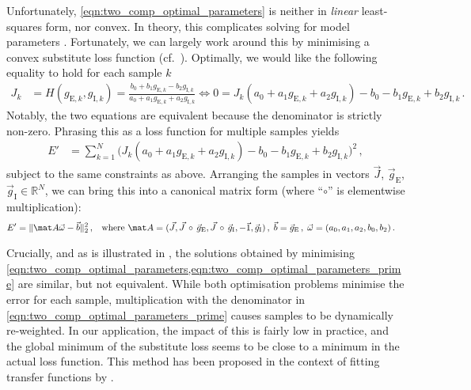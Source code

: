 Unfortunately, \cref{eqn:two_comp_optimal_parameters} is neither in \emph{linear} least-squares form, nor convex.
In theory, this complicates solving for model parameters \citep{rockafellar1993lagrange}.
Fortunately, we can largely work around this by minimising a convex substitute loss function (cf.~).
Optimally, we would like the following equality to hold for each sample $k$
\begin{align*}
	J_k &= H(g_{\mathrm{E}, k}, g_{\mathrm{I}, k}) = \frac{
		b_0 + b_1 g_{\mathrm{E}, k} - b_2 g_{\mathrm{I}, k}
	}{
		a_0 + a_1 g_{\mathrm{E}, k} + a_2 g_{\mathrm{I}, k}
 	} \Leftrightarrow 0 = J_k (a_0 + a_1 g_{\mathrm{E}, k} + a_2 g_{\mathrm{I}, k}) - b_0 - b_1 g_{\mathrm{E}, k} + b_2 g_{\mathrm{I}, k} \,.
\end{align*}
Notably, the two equations are equivalent because the denominator is strictly non-zero.
Phrasing this as a loss function for multiple samples yields
\begin{align}
	E' &= \sum_{k = 1}^N \bigl( J_k (a_0 + a_1 g_{\mathrm{E}, k} + a_2 g_{\mathrm{I}, k}) - b_0 - b_1 g_{\mathrm{E}, k} + b_2 g_{\mathrm{I}, k} \bigr)^2 \,,
	\label{eqn:two_comp_optimal_parameters_prime}
\end{align}
subject to the same constraints as above.
Arranging the samples in vectors $\vec J$, $\vec g_\mathrm{E}$, $\vec g_\mathrm{I} \in \mathbb{R}^N$, we can bring this into a canonical matrix form (where \enquote{$\circ$} is elementwise multiplication):
\begin{align}
	E' &= \|\mat A \vec \omega - \vec b \|_2^2 \,, & \text{where } \mat A = (\vec J, \vec J \, \circ \,  \vec g_\mathrm{E}, \vec J \, \circ \, \vec g_\mathrm{I}, -\vec{1}, \vec{g}_\mathrm{I}) \,, \; \vec b = \vec{g}_\mathrm{E} \,, \; \vec \omega &= (a_0, a_1, a_2, b_0, b_2) \,.
	\label{eqn:two_comp_optimal_parameters_prime_matrix}
\end{align}

Crucially, and as is illustrated in , the solutions obtained by minimising \cref{eqn:two_comp_optimal_parameters,eqn:two_comp_optimal_parameters_prime} are similar, but not equivalent.
While both optimisation problems minimise the error for each sample, multiplication with the denominator in \cref{eqn:two_comp_optimal_parameters_prime} causes samples to be dynamically re-weighted.
In our application, the impact of this is fairly low in practice, and the global minimum of the substitute loss seems to be close to a minimum in the actual loss function.
This method has been proposed in the context of fitting transfer functions by \citet{levy1959complexcurve}.

